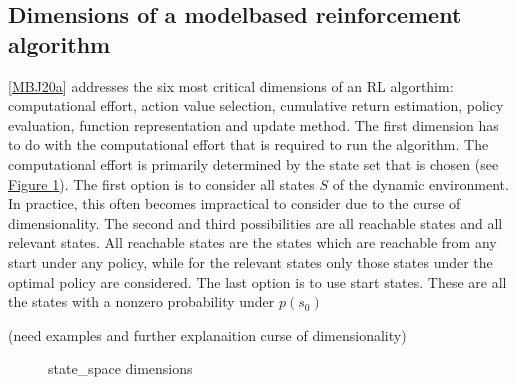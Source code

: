 \documentclass[letterpaper,10pt,english]{jupyterBook}
\let\sphinxpxdimen\pdfpxdimen\else\newdimen\sphinxpxdimen
\begin{document}
\subsection{Dimensions of a model\sphinxhyphen{}based reinforcement algorithm}
\label{\detokenize{Reinforcement_learning:dimensions-of-a-model-based-reinforcement-algorithm}}
\sphinxAtStartPar
{[}\hyperlink{cite.Discussion:id7}{MBJ20a}{]} addresses the six most critical dimensions of an RL algorthim: computational effort, action value selection, cumulative return estimation, policy evaluation, function representation and update method. The first dimension has to do with the computational effort that is required to run the algorithm. The computational effort is primarily determined by the state set that is chosen (see \hyperref[\detokenize{Reinforcement_learning:state-space-fig}]{Figure \ref{\detokenize{Reinforcement_learning:state-space-fig}}}). The first option is to consider all states \(S\) of the dynamic environment. In practice, this often becomes impractical to consider due to the curse of dimensionality. The second and third possibilities are all reachable states and all relevant states. All reachable states are the states which are reachable from any start under any policy, while for the relevant states only those states under the optimal policy are considered. The last option is to use start states. These are all the states with a non\sphinxhyphen{}zero probability under \(p(s_0)\)

\sphinxAtStartPar
(need examples and further explanaition curse of dimensionality)

\begin{figure}[htbp]
\centering
\capstart

\noindent\sphinxincludegraphics[width=500\sphinxpxdimen,height=350\sphinxpxdimen]{{state_space}.png}
\caption{state\_space dimensions}\label{\detokenize{Reinforcement_learning:state-space-fig}}\end{figure}
\end{document}
